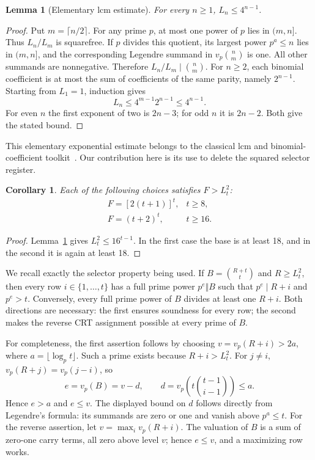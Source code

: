 \documentclass[11pt]{article}
\newtheorem{lemma}[theorem]{Lemma}
\newtheorem{corollary}[theorem]{Corollary}
\theoremstyle{remark}\newtheorem{remark}[theorem]{Remark}
\begin{document}
\begin{lemma}[Elementary lcm estimate]\label{lem:lcm}
For every $n\ge1$, $L_n\le4^{n-1}$.
\end{lemma}
\begin{proof}
Put $m=\lceil n/2\rceil$. For any prime $p$, at most one power of $p$
lies in $(m,n]$. Thus $L_n/L_m$ is squarefree. If $p$ divides this quotient,
its largest power $p^a\le n$ lies in $(m,n]$, and the corresponding
Legendre summand in $v_p\binom nm$ is one. All other summands are
nonnegative. Therefore $L_n/L_m\mid\binom nm$.
For $n\ge2$, each binomial coefficient is at most the sum of coefficients
of the same parity, namely $2^{n-1}$. Starting from $L_1=1$, induction gives
\[
 L_n\le4^{m-1}2^{n-1}\le4^{n-1}.
\]
For even $n$ the first exponent of two is $2n-3$; for odd $n$ it is
$2n-2$. Both give the stated bound.
\end{proof}

This elementary exponential estimate belongs to the classical lcm and
binomial-coefficient toolkit~\cite{farhi,chan}. Our contribution here is
its use to delete the squared selector register.

\begin{corollary}\label{cor:selector}
Each of the following choices satisfies $F>L_t^2$:
\[
\begin{array}{ll}
 F=[2(t+1)]^t,&t\ge8,\\
 F=(t+2)^t,&t\ge16.
\end{array}
\]
\end{corollary}
\begin{proof}
Lemma~\ref{lem:lcm} gives $L_t^2\le16^{t-1}$. In the first case the
base is at least 18, and in the second it is again at least 18.
\end{proof}

We recall exactly the selector property being used. If
$B=\binom{R+t}{t}$ and $R\ge L_t^2$, then every row $i\in\{1,\ldots,t\}$
has a full prime power $p^e\Vert B$ such that $p^e\mid R+i$ and $p^e>t$.
Conversely, every full prime power of $B$ divides at least one $R+i$.
Both directions are necessary: the first ensures soundness for every
row; the second makes the reverse CRT assignment possible at every
prime of $B$.

For completeness, the first assertion follows by choosing
$v=v_p(R+i)>2a$, where $a=\lfloor\log_p t\rfloor$. Such a prime exists
because $R+i>L_t^2$. For $j\ne i$, $v_p(R+j)=v_p(j-i)$, so
\[
 e=v_p(B)=v-d,\qquad
 d=v_p\!\left(t\binom{t-1}{i-1}\right)\le a.
\]
Hence $e>a$ and $e\le v$. The displayed bound on $d$ follows directly
from Legendre's formula: its summands are zero or one and vanish above
$p^a\le t$. For the reverse assertion, let $v=\max_i v_p(R+i)$.
The valuation of $B$ is a sum of zero-one carry terms, all zero above
level $v$; hence $e\le v$, and a maximizing row works.
\end{document}
